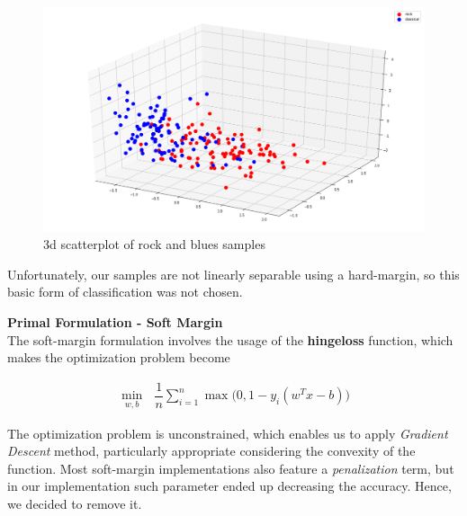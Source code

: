 \documentclass[12pt]{article}
\begin{document}
	\begin{figure}[H]
		\hspace{120pt}\includegraphics[scale=0.2]{exp1_legend}
		\caption{3d scatterplot of rock and blues samples}
	\end{figure}
	
	Unfortunately, our samples are not linearly separable using a hard-margin, so this basic form of classification was not chosen.\newpage
	
	\textbf{Primal Formulation - Soft Margin}\\
	The soft-margin formulation involves the usage of the \textbf{hingeloss} function, which makes the optimization problem become
	
	\begin{align}
		\min_{w,b}\ \ \ \dfrac {1}{n} \sum_{i=1}^n{\max{\Big(0,1-y_i(w^Tx-b)\Big)}}
	\end{align}

	The optimization problem is unconstrained, which enables us to apply \textit{Gradient Descent} method, particularly appropriate considering the convexity of the function. Most soft-margin implementations also feature a \textit{penalization} term, but in our implementation such parameter ended up decreasing the accuracy. Hence, we decided to remove it.
	
\end{document}
